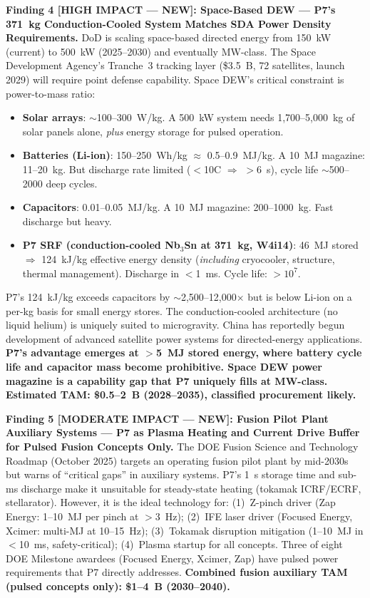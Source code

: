 \documentclass[11pt]{article}
\begin{document}
\begin{tcolorbox}[colback=blue!5!white, colframe=blue!60!black,
  title=\textbf{W4i16 P7 --- Top 5 Findings (Ranked by Impact)}]
\textbf{Finding 4 [HIGH IMPACT --- NEW]: Space-Based DEW ---
P7's 371~kg Conduction-Cooled System Matches SDA Power Density
Requirements.}
DoD is scaling space-based directed energy from 150~kW (current)
to 500~kW (2025--2030) and eventually MW-class. The Space
Development Agency's Tranche~3 tracking layer (\$3.5~B, 72
satellites, launch 2029) will require point defense capability.
Space DEW's critical constraint is power-to-mass ratio:
\begin{itemize}[nosep]
  \item \textbf{Solar arrays}: $\sim$100--300~W/kg. A 500~kW
    system needs 1,700--5,000~kg of solar panels alone,
    \emph{plus} energy storage for pulsed operation.
  \item \textbf{Batteries (Li-ion)}: 150--250~Wh/kg $\approx$
    0.5--0.9~MJ/kg. A 10~MJ magazine: 11--20~kg. But
    discharge rate limited ($<$10C $\Rightarrow$ $>$6~s),
    cycle life $\sim$500--2000 deep cycles.
  \item \textbf{Capacitors}: 0.01--0.05~MJ/kg. A 10~MJ
    magazine: 200--1000~kg. Fast discharge but heavy.
  \item \textbf{P7 SRF (conduction-cooled Nb$_3$Sn at 371~kg,
    W4i14)}: 46~MJ stored $\Rightarrow$ 124~kJ/kg effective
    energy density (\emph{including} cryocooler, structure,
    thermal management). Discharge in $<$1~ms.
    Cycle life: $>10^7$.
\end{itemize}
P7's 124~kJ/kg exceeds capacitors by $\sim$2,500--12,000$\times$
but is below Li-ion on a per-kg basis for small energy stores.
The conduction-cooled architecture (no liquid helium) is uniquely
suited to microgravity. China has reportedly begun development of
advanced satellite power systems for directed-energy applications.
\textbf{P7's advantage emerges at $>$5~MJ stored energy, where
battery cycle life and capacitor mass become prohibitive.
Space DEW power magazine is a capability gap that P7 uniquely
fills at MW-class. Estimated TAM: \$0.5--2~B (2028--2035),
classified procurement likely.}

\textbf{Finding 5 [MODERATE IMPACT --- NEW]: Fusion Pilot Plant
Auxiliary Systems --- P7 as Plasma Heating and Current Drive
Buffer for Pulsed Fusion Concepts Only.}
The DOE Fusion Science and Technology Roadmap (October 2025) targets
an operating fusion pilot plant by mid-2030s but warns of ``critical
gaps'' in auxiliary systems. P7's 1~s storage time and sub-ms
discharge make it unsuitable for steady-state heating (tokamak
ICRF/ECRF, stellarator). However, it is the ideal technology for:
(1)~Z-pinch driver (Zap Energy: 1--10~MJ per pinch at $>$3~Hz);
(2)~IFE laser driver (Focused Energy, Xcimer: multi-MJ at
10--15~Hz); (3)~Tokamak disruption mitigation (1--10~MJ in
$<$10~ms, safety-critical); (4)~Plasma startup for all concepts.
Three of eight DOE Milestone awardees (Focused Energy, Xcimer,
Zap) have pulsed power requirements that P7 directly addresses.
\textbf{Combined fusion auxiliary TAM (pulsed concepts only):
\$1--4~B (2030--2040).}

\end{tcolorbox}
\end{document}
